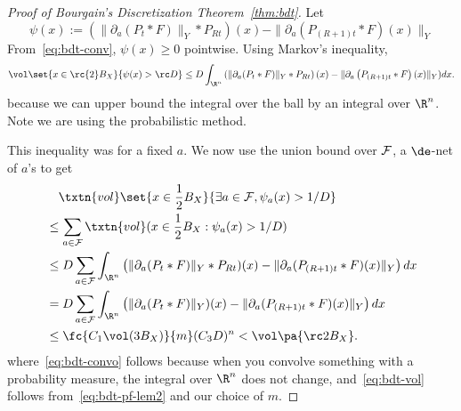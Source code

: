 \begin{proof}[Proof of Bourgain's Discretization Theorem~\ref{thm:bdt}]
Let 
\[
\psi(x):=\left(\|\partial_a(P_t*F)\|_Y * P_{Rt}\right)(x) - \|\partial_a\left(P_{(R + 1)t}*F\right)(x)\|_Y
\]
From~\eqref{eq:bdt-conv}, $\psi(x)\ge 0$ pointwise. 
Using Markov's inequality,
\[
\vol\set{x\in \rc{2}B_X}{\psi(x)>\rc D}\leq D\int_{\R^n} \left(\|\partial_a(P_t*F)\|_Y * P_{Rt}\right)(x) - \|\partial_a\left(P_{(R + 1)t}*F\right)(x)\|_Y ) dx.
\]
because we can upper bound the integral over the ball by an integral over $\R^n$. 
Note we are using the probabilistic method. %

This inequality was for a fixed $a$. We now use the union bound over $\cal F$, a $\de$-net of $a$'s to get
\begin{align}
&\quad \txtn{vol}\set{x \in \frac{1}{2}B_X}{\exists a \in \mathcal{F}, \psi_a(x) > 1/D}\\ &\leq \sum_{a \in \mathcal{F}} \txtn{vol}(x \in \frac{1}{2}B_X: \psi_a(x) > 1/D)\\
&\leq D\sum_{a \in \mathcal{F}} \int_{\R^n}\left(\|\partial_a(P_t*F)\|_Y * P_{Rt})(x) - \|\partial_a(P_{(R + 1)t} * F)(x)\|_Y\right) dx\\
&=D\sum_{a \in \mathcal{F}} \int_{\R^n}\left(\|\partial_a(P_t*F)\|_Y)(x) - \|\partial_a(P_{(R + 1)t} * F)(x)\|_Y\right) dx \label{eq:bdt-convo}\\
&\le \fc{C_1\vol(3B_X)}{m} (C_3D)^n < \vol\pa{\rc2B_X}.\label{eq:bdt-vol}
\end{align}
where~\eqref{eq:bdt-convo} follows because when you convolve something with a probability measure, the integral over $\R^n$ does not change, and~\eqref{eq:bdt-vol} follows from~\eqref{eq:bdt-pf-lem2} and our choice of $m$.



\end{proof}
